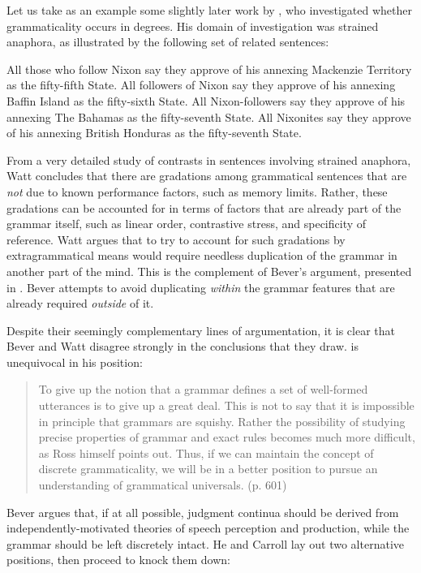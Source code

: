 Let us take as an example some slightly later work by \citet{Watt1975}, who investigated whether grammaticality occurs in degrees. His domain of investigation was strained anaphora, as illustrated by the following set of related sentences:

\ea
\ea All those who follow Nixon say they approve of his annexing Mackenzie Territory as the fifty-fifth State.
\ex All followers of Nixon say they approve of his annexing Baffin Island as the fifty-sixth State.
\ex All Nixon-followers  say they approve of his annexing The Bahamas as the fifty-seventh State.
\ex All Nixonites say they approve of his annexing British Honduras as the fifty-seventh  State.
\z
\z


\noindent
From a very detailed study of contrasts in sentences involving strained anaphora, Watt concludes that there are gradations among grammatical sentences that are
\textit{not} due to known performance factors, such as memory limits. Rather, these gradations can be accounted for in terms of factors that are already part of the grammar itself,  such as linear order, contrastive stress, and specificity of reference. Watt argues that to try to account for such gradations by extragrammatical means would require needless duplication of the grammar in another part of the mind. This is the complement of Bever's argument, presented in . Bever attempts to avoid duplicating \textit{within} the grammar features that are already required \textit{outside} of it.

Despite their seemingly complementary lines of argumentation, it is clear that Bever and Watt disagree strongly in the conclusions that they draw. \citet{Bever1975a} is unequivocal in his position:

\begin{quote}
To give up the notion that a grammar defines a set of well-formed utterances is to give up a great deal. This is not to say that it is impossible in principle  that  grammars  are  squishy.  Rather  the  possibility of studying precise properties of grammar and exact rules becomes much more difficult, as Ross himself  points out. Thus, if we can maintain the concept of discrete grammaticality, we will be in a better position to pursue an understanding of grammatical universals. (p. 601)
\end{quote}

\noindent
Bever argues that, if at all possible, judgment continua should be derived from independently-motivated theories of speech perception and production, while the grammar should be left discretely intact. He and Carroll lay out two alternative positions, then proceed to knock them down:

